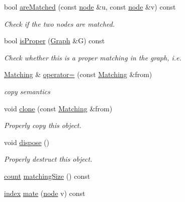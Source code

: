 \begin{DoxyCompactItemize}
bool \hyperlink{class_ensemble_clustering_1_1_matching_ad2637dece8a3a56d9f62f3c9df4713db}{are\-Matched} (const \hyperlink{namespace_ensemble_clustering_ae829290aeccd1a420b17a37fd901f114}{node} \&u, const \hyperlink{namespace_ensemble_clustering_ae829290aeccd1a420b17a37fd901f114}{node} \&v) const 
\begin{DoxyCompactList}\small\item\em Check if the two nodes are matched. \end{DoxyCompactList}\item 
bool \hyperlink{class_ensemble_clustering_1_1_matching_a29b8fa3ba916f0b3d73b184c883c36b6}{is\-Proper} (\hyperlink{class_ensemble_clustering_1_1_graph}{Graph} \&G) const 
\begin{DoxyCompactList}\small\item\em Check whether this is a proper matching in the graph, i.\-e. \end{DoxyCompactList}\item 
\hyperlink{class_ensemble_clustering_1_1_matching}{Matching} \& \hyperlink{class_ensemble_clustering_1_1_matching_aa1d0732ec84c2012fd3e642595f23556}{operator=} (const \hyperlink{class_ensemble_clustering_1_1_matching}{Matching} \&from)
\begin{DoxyCompactList}\small\item\em copy semantics \end{DoxyCompactList}\item 
void \hyperlink{class_ensemble_clustering_1_1_matching_a6753fd67c53b6e0d94f2d6e0d6de640e}{clone} (const \hyperlink{class_ensemble_clustering_1_1_matching}{Matching} \&from)
\begin{DoxyCompactList}\small\item\em Properly copy this object. \end{DoxyCompactList}\item 
void \hyperlink{class_ensemble_clustering_1_1_matching_ae7e8c62662439dc7adae829506d2dd32}{dispose} ()
\begin{DoxyCompactList}\small\item\em Properly destruct this object. \end{DoxyCompactList}\item 
\hyperlink{namespace_ensemble_clustering_a2482e94ca22a0c6544a5a9173186fde8}{count} \hyperlink{class_ensemble_clustering_1_1_matching_a0e9020a85e9f6e8d0bf0ec236394b2e8}{matching\-Size} () const 
\item 
\hyperlink{namespace_ensemble_clustering_a1ba11e6d628873b803a26fe054f45e28}{index} \hyperlink{class_ensemble_clustering_1_1_matching_adc5f7971cb778e55e58b140e1371b89d}{mate} (\hyperlink{namespace_ensemble_clustering_ae829290aeccd1a420b17a37fd901f114}{node} v) const 
\end{DoxyCompactItemize}

